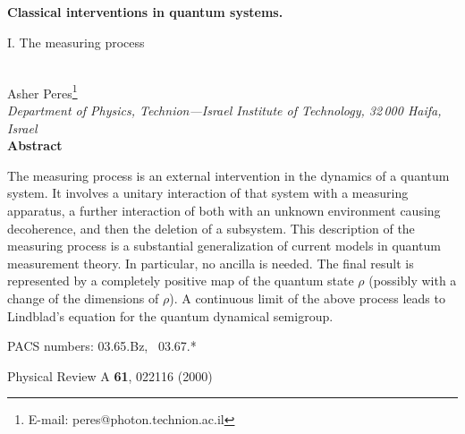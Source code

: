 \setlength{\textwidth}{160mm}
\setlength{\textheight}{230mm}            
\setlength{\topmargin}{-8mm}             
\setlength{\oddsidemargin}{-1mm}
\parindent5mm 

\def\beq{\begin{equation}}
\def\eeq{\end{equation}}
\def\Eq{Eq.~(\ref}
\def\0{\otimes}
\def\6{\langle}
\def\9{\rangle}
\def\Tr{\mbox{Tr}\,}
\def\bc{\medskip\begin{center}}
\def\ec{\end{center}\medskip}
\def\cC{$\cal C$}



\renewcommand{\thefootnote}{\fnsymbol{footnote}}

\vspace*{\fill}
\begin{center}
{\Large {\bf Classical interventions in quantum systems.\medskip 

I. The measuring process}}\\[15mm]

Asher Peres\footnote{E-mail: peres@photon.technion.ac.il} \\[8mm]
{\sl Department of Physics, Technion---Israel Institute of Technology,
32\,000 Haifa, Israel}\\[15mm]

{\bf Abstract}

\end{center}

The measuring process is an external intervention in the dynamics of a
quantum system. It involves a unitary interaction of that system with a
measuring apparatus, a further interaction of both with an unknown
environment causing decoherence, and then the deletion of a subsystem.
This description of the measuring process is a substantial
generalization of current models in quantum measurement theory. In
particular, no ancilla is needed. The final result is represented by a
completely positive map of the quantum state $\rho$ (possibly with a
change of the dimensions of $\rho$). A continuous limit of the above
process leads to Lindblad's equation for the quantum dynamical
semigroup.\vfill

\noindent PACS numbers: 03.65.Bz, \ 03.67.* \vfill

\noindent Physical Review A {\bf61}, 022116 (2000) \vfill

